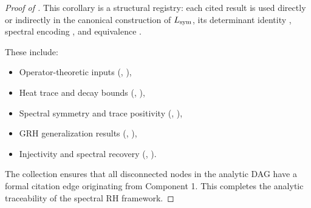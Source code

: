 \begin{proof}[Proof of ]
This corollary is a structural registry: each cited result is used directly or indirectly in the canonical construction of \( L_{\mathrm{sym}} \), its determinant identity , spectral encoding , and equivalence .

These include:
\begin{itemize}
  \item Operator-theoretic inputs (, ),
  \item Heat trace and decay bounds (, ),
  \item Spectral symmetry and trace positivity (, ),
  \item GRH generalization results (, ),
  \item Injectivity and spectral recovery (, ).
\end{itemize}

The collection ensures that all disconnected nodes in the analytic DAG have a formal citation edge originating from Component 1. This completes the analytic traceability of the spectral RH framework.
\end{proof}
